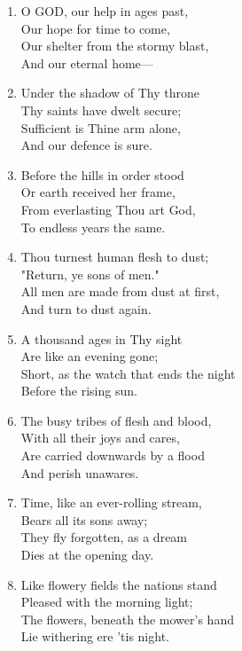\begin{enumerate}
    \item O GOD, our help in ages past, \\
        Our hope for time to come, \\
        Our shelter from the stormy blast, \\
        And our eternal home---

    \item Under the shadow of Thy throne \\
        Thy saints have dwelt secure; \\
        Sufficient is Thine arm alone, \\
        And our defence is sure.

    \item Before the hills in order stood \\
        Or earth received her frame, \\
        From everlasting Thou art God, \\
        To endless years the same.

    \item Thou turnest human flesh to dust; \\
        "Return, ye sons of men." \\
        All men are made from dust at first, \\
        And turn to dust again.

    \item A thousand ages in Thy sight \\
        Are like an evening gone; \\
        Short, as the watch that ends the night \\
        Before the rising sun.

    \item The busy tribes of flesh and blood, \\
        With all their joys and cares, \\
        Are carried downwards by a flood \\
        And perish unawares.

    \item Time, like an ever-rolling stream, \\
        Bears all its sons away; \\
        They fly forgotten, as a dream \\
        Dies at the opening day.

    \item Like flowery fields the nations stand \\
        Pleased with the morning light; \\
        The flowers, beneath the mower's hand \\
        Lie withering ere 'tis night.


\end{enumerate}
